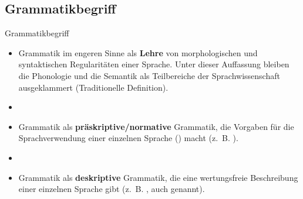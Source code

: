 %	
\subsection{Grammatikbegriff}

\begin{frame}{Grammatikbegriff}

\begin{itemize}
	\item<1-> Grammatik im engeren Sinne als \textbf{Lehre} von morphologischen und syntaktischen Regularitäten einer Sprache. Unter dieser Auffassung bleiben die Phonologie und die Semantik als Teilbereiche der Sprachwissenschaft ausgeklammert (Traditionelle Definition).
	\item[]
	\item<2-> Grammatik als \textbf{präskriptive/normative} Grammatik, die Vorgaben für die  Sprachverwendung einer einzelnen Sprache () macht (z.~B. \citet{DudenGramm09d}).
	\item[]
	\item<3-> Grammatik als \textbf{deskriptive} Grammatik, die eine wertungsfreie Beschreibung einer einzelnen Sprache gibt (z.~B. \citet{Eisenberg00a}, auch  genannt).
\end{itemize}

\end{frame}



